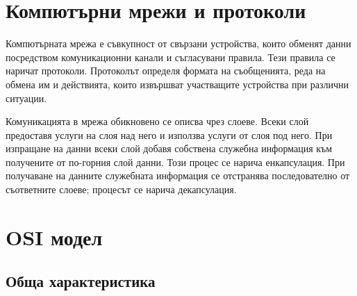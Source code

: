 \begin{konspekt}
\end{konspekt}

\section{Компютърни мрежи и протоколи}\label{s:13.1}

\begin{defn}
Компютърната мрежа е съвкупност от свързани устройства, които обменят данни посредством комуникационни канали и съгласувани правила. Тези правила се наричат протоколи. Протоколът определя формата на съобщенията, реда на обмена им и действията, които извършват участващите устройства при различни ситуации.
\end{defn}

\begin{defn}
Комуникацията в мрежа обикновено се описва чрез слоеве. Всеки слой предоставя услуги на слоя над него и използва услуги от слоя под него. При изпращане на данни всеки слой добавя собствена служебна информация към получените от по-горния слой данни. Този процес се нарича енкапсулация. При получаване на данните служебната информация се отстранява последователно от съответните слоеве; процесът се нарича декапсулация.
\end{defn}

\section{OSI модел}\label{s:13.2}

\subsection{Обща характеристика}\label{s:13.2.1}

